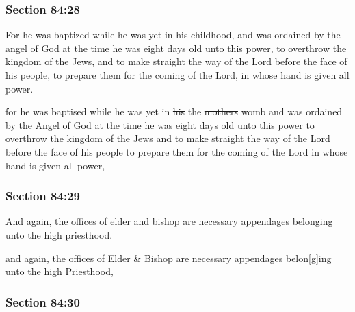 	\subsubsection{Section 84:28} %
		\label{DC84-28}

		For he was baptized while he was yet in his childhood, and was ordained by the angel of God at the time he was eight days old unto this power, to overthrow the kingdom of the Jews, and to make straight the way of the Lord before the face of his people, to prepare them for the coming of the Lord, in whose hand is given all power.

		\begin{framed}
		\scriptsize
			\begin{compactdesc}
				\item[JSP] for he was baptised while he was yet in \sout{his} the \sout{mothers} womb and was ordained by the Angel of God at the time he was eight days old unto this power to overthrow the kingdom of the Jews and to make straight the way of the Lord before the face of his people to prepare them for the coming of the Lord in whose hand is given all power,
			\end{compactdesc}
		\end{framed}

	\subsubsection{Section 84:29} %
		\label{DC84-29}

		And again, the offices of elder and bishop are necessary appendages belonging unto the high priesthood.

		\begin{framed}
		\scriptsize
			\begin{compactdesc}
				\item[JSP] and again, the offices of Elder \& Bishop are necessary appendages belon[g]ing unto the high Priesthood,
			\end{compactdesc}
		\end{framed}

	\subsubsection{Section 84:30} %
		\label{DC84-30}

